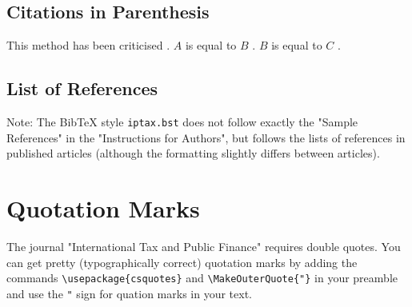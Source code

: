 \documentclass{itaxpf}
\begin{document}
\subsection{Citations in Parenthesis}

This method has been criticised \citep{becker64, schoemaker80, smith86}.
$A$ is equal to $B$ \citep{becker64}.
$B$ is equal to $C$ \citep{schoemaker80}.


\subsection{List of References}

Note: The Bib\TeX{} style \texttt{iptax.bst} does not follow exactly
the "Sample References" in the "Instructions for Authors",
but follows the lists of references in published articles
(although the formatting slightly differs between articles).


\section{Quotation Marks}
The journal "International Tax and Public Finance" requires double quotes.
You can get pretty (typographically correct) quotation marks
by adding the commands
\verb!\usepackage{csquotes}!
and
\verb!\MakeOuterQuote{"}!
in your preamble and use the \verb!"! sign for quation marks in your text.


\listofendnotes

\nocite{*}



\end{document}
